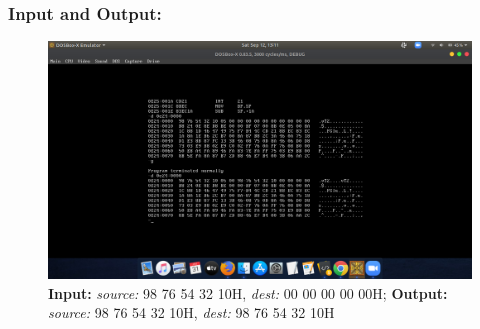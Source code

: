 \documentclass[12pt,a4paper]{article}
\begin{document}
\begin{flushleft}
\subsubsection*{\textbf{Input and Output:}}
\begin{figure}[h]
    \centering
    \includegraphics[trim = 100mm 60mm 100mm 80mm, clip, width = \textwidth]{Pics/StrinsIO.png}
    \caption{ \textbf{Input:} \emph{source:} 98 76 54 32 10H, \emph{dest:} 00 00 00 00 00H; \newline \hspace{1cm}
              \textbf{Output:} \emph{source:} 98 76 54 32 10H, \emph{dest:} 98 76 54 32 10H}
\end{figure}
\end{flushleft}
\end{document}
